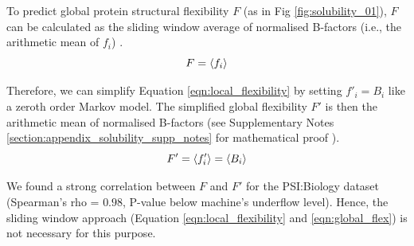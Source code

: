 To predict global protein structural flexibility $F$ (as in Fig \ref{fig:solubility_01}), $F$ can be calculated as the sliding window average of normalised B-factors (i.e., the arithmetic mean of $f_i$) \citep{vihinen1994accuracy,Cock2009-jl}. 
\begin{equation}
    F = \langle f_i \rangle
    \label{eqn:global_flex}\vspace*{-10pt}
\end{equation}

Therefore, we can simplify Equation \ref{eqn:local_flexibility} by setting $f'_i = B_i$ like a zeroth order Markov model. The simplified global flexibility $F'$ is then the arithmetic mean of normalised B-factors (see Supplementary Notes \ref{section:appendix_solubility_supp_notes} for mathematical proof ).
\begin{equation}
    F' = \langle f'_i \rangle = \langle B_i \rangle
    \label{eqn:Markov_model}\vspace*{-5pt}
\end{equation}

We found a strong correlation between $F$ and $F'$ for the PSI:Biology dataset (Spearman’s rho = $0.98$, P-value below machine’s underflow level). Hence, the sliding window approach (Equation \ref{eqn:local_flexibility} and \ref{eqn:global_flex}) is not necessary for this purpose.





